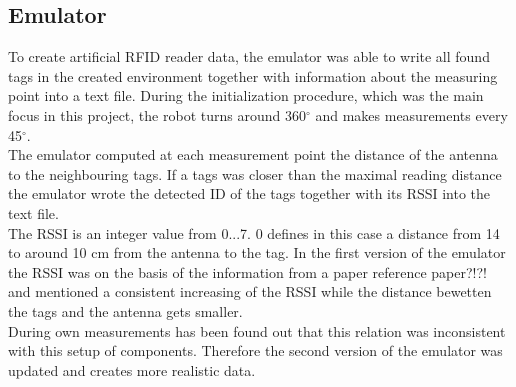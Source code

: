 \subsection{Emulator}
To create artificial RFID reader data, the emulator was able to write all found tags in the created environment together with information about the measuring point into a text file. During the initialization procedure, which was the main focus in this project, the robot turns around 360$^\circ$ and makes measurements every 45$^\circ$. \\
The emulator computed at each measurement point the distance of the antenna to the neighbouring tags. If a tags was closer than the maximal reading distance the emulator wrote the detected ID of the tags together with its RSSI into the text file. \\
The RSSI is an integer value from 0...7. 0 defines in this case a distance from 14 to around 10 cm from the antenna to the tag. In the first version of the emulator the RSSI was on the basis of the information from a paper {\color{red}reference paper?!?!} and mentioned a consistent increasing of the RSSI while the distance bewetten the tags and the antenna gets smaller. \\
During own measurements has been found out that this relation was inconsistent with this setup of components. Therefore the second version of the emulator was updated and creates more realistic data.\\


